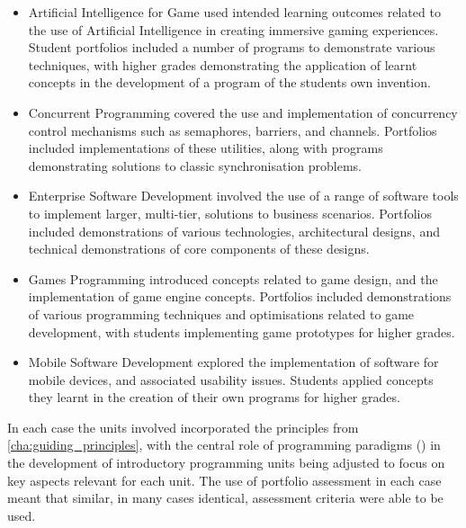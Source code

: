 \begin{itemize}[noitemsep,nolistsep]
	\item Artificial Intelligence for Game used intended learning outcomes related to the use of Artificial Intelligence in creating immersive gaming experiences. Student portfolios included a number of programs to demonstrate various techniques, with higher grades demonstrating the application of learnt concepts in the development of a program of the students own invention.
	\item Concurrent Programming covered the use and implementation of concurrency control mechanisms such as semaphores, barriers, and channels. Portfolios included implementations of these utilities, along with programs demonstrating solutions to classic synchronisation problems.   
	\item Enterprise Software Development involved the use of a range of software tools to implement larger, multi-tier, solutions to business scenarios. Portfolios included demonstrations of various technologies, architectural designs, and technical demonstrations of core components of these designs.
	\item Games Programming introduced concepts related to game design, and the implementation of game engine concepts. Portfolios included demonstrations of various programming techniques and optimisations related to game development, with students implementing game prototypes for higher grades.
	\item Mobile Software Development explored the implementation of software for mobile devices, and associated usability issues. Students applied concepts they learnt in the creation of their own programs for higher grades.
\end{itemize}

In each case the units involved incorporated the principles from \cref{cha:guiding_principles}, with the central role of programming paradigms () in the development of introductory programming units being adjusted to focus on key aspects relevant for each unit. The use of portfolio assessment in each case meant that similar, in many cases identical, assessment criteria were able to be used.

